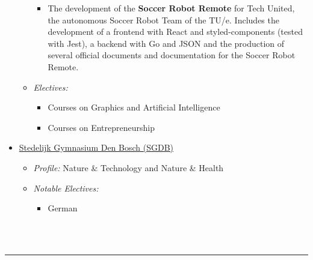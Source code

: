 \documentclass[11pt]{article}
\begin{document}
\begin{itemize}
\begin{itemize}[noitemsep, nolistsep]
\begin{itemize}[noitemsep, nolistsep]
				\item The development of the \textbf{Soccer Robot Remote} for Tech United, the autonomous Soccer Robot Team of the TU/e. Includes the development of a frontend with React and styled-components (tested with Jest), a backend with Go and JSON and the production of several official documents and documentation for the Soccer Robot Remote.
			\end{itemize}
			\item \textit{Electives:}
			\begin{itemize}[noitemsep, nolistsep]
				\item Courses on Graphics and Artificial Intelligence
				\item Courses on Entrepreneurship
			\end{itemize}
		\end{itemize}
		\item \underline{Stedelijk Gymnasium Den Bosch (SGDB)} \hfill \textit{\color{Blue}{09/2009-07/2015}}
		\begin{itemize}[noitemsep, nolistsep]
			\item \textit{Profile:} Nature \& Technology and Nature \& Health
			\item \textit{Notable Electives:}
			\begin{itemize}[noitemsep, nolistsep]
				\item German
			\end{itemize}
		\end{itemize}
	\end{itemize}
	\ \\\ \\
	\noindent\rule{\textwidth}{0.4pt}	
\end{document}
